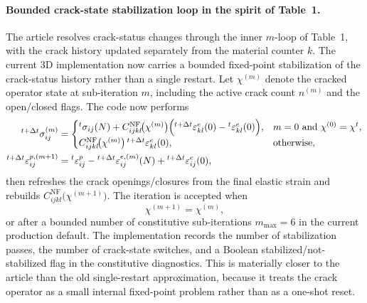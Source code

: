 \paragraph{Bounded crack-state stabilization loop in the spirit of Table~1.}
The article resolves crack-status changes through the inner \(m\)-loop of
Table~1, with the crack history updated separately from the material counter
\(k\).  The current 3D implementation now carries a bounded fixed-point
stabilization of the crack-status history rather than a single restart.  Let
\(\chi^{(m)}\) denote the cracked operator state at sub-iteration \(m\),
including the active crack count \(n^{(m)}\) and the open/closed flags.  The
code now performs
\begin{align}
  {}^{t+\Delta t}\sigma_{ij}^{(m)}
  &=
  \begin{cases}
    {}^{t}\sigma_{ij}(N)
    +
    C_{ijkl}^{\mathrm{NF}}\!\bigl(\chi^{(m)}\bigr)
    \Bigl(
      {}^{t+\Delta t}\varepsilon_{kl}^{e}(0)
      -
      {}^{t}\varepsilon_{kl}^{e}(0)
    \Bigr),
    & m = 0 \text{ and } \chi^{(0)} = \chi^{t},
    \\[0.5ex]
    C_{ijkl}^{\mathrm{NF}}\!\bigl(\chi^{(m)}\bigr)
    \,{}^{t+\Delta t}\varepsilon_{kl}^{e}(0),
    & \text{otherwise,}
  \end{cases}
  \\
  {}^{t+\Delta t}\varepsilon_{ij}^{p,(m+1)}
  &=
  {}^{t}\varepsilon_{ij}^{p}
  -
  {}^{t+\Delta t}\varepsilon_{ij}^{e,(m)}(N)
  +
  {}^{t+\Delta t}\varepsilon_{ij}^{e}(0),
\end{align}
then refreshes the crack openings/closures from the final elastic strain and
rebuilds \(C_{ijkl}^{\mathrm{NF}}\bigl(\chi^{(m+1)}\bigr)\).  The iteration is
accepted when
\[
  \chi^{(m+1)} = \chi^{(m)},
\]
or after a bounded number of constitutive sub-iterations
\(m_{\max}=6\) in the current production default.  The implementation records
the number of stabilization passes, the number of crack-state switches, and a
Boolean stabilized/not-stabilized flag in the constitutive diagnostics.  This
is materially closer to the article than the old single-restart
approximation, because it treats the crack operator as a small internal
fixed-point problem rather than as a one-shot reset.

